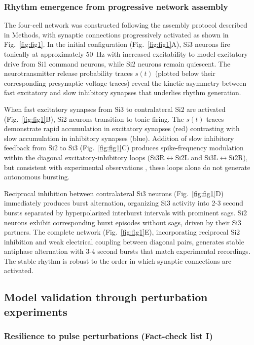 \documentclass[nofootinbib,aip,amsmath,amssymb,preprint,twocolumn,floatfix,10pt]{revtex4-2}
\begin{document}
\subsubsection{Rhythm emergence from progressive network assembly}
%
The four-cell network was constructed following the assembly protocol described in Methods, with synaptic connections progressively activated as shown in Fig.~\ref{fig:fig1}. In the initial configuration (Fig.~\ref{fig:fig1}A), Si3 neurons fire tonically at approximately 50~Hz with increased excitability to model excitatory drive from Si1 command neurons, while Si2 neurons remain quiescent. The neurotransmitter release probability traces $s(t)$ (plotted below their corresponding presynaptic voltage traces) reveal the kinetic asymmetry between fast excitatory and slow inhibitory synapses that underlies rhythm generation. 

When fast excitatory synapses from Si3 to contralateral Si2 are activated (Fig.~\ref{fig:fig1}B), Si2 neurons transition to tonic firing. The $s(t)$ traces demonstrate rapid accumulation in excitatory synapses (red) contrasting with slow accumulation in inhibitory synapses (blue). Addition of slow inhibitory feedback from Si2 to Si3 (Fig.~\ref{fig:fig1}C) produces spike-frequency modulation within the diagonal excitatory-inhibitory loops (Si3R$\leftrightarrow$Si2L and Si3L$\leftrightarrow$Si2R), but consistent with experimental observations \cite{SakuraiKatz2016}, these loops alone do not generate autonomous bursting. 

Reciprocal inhibition between contralateral Si3 neurons (Fig.~\ref{fig:fig1}D) immediately produces burst alternation, organizing Si3 activity into 2-3 second bursts separated by hyperpolarized interburst intervals with prominent sags. Si2 neurons exhibit corresponding burst episodes without sags, driven by their Si3 partners. The complete network (Fig.~\ref{fig:fig1}E), incorporating reciprocal Si2 inhibition and weak electrical coupling between diagonal pairs, generates stable antiphase alternation with 3-4 second bursts that match experimental recordings. The stable rhythm is robust to the order in which synaptic connections are activated.

\subsection{Model validation through perturbation experiments}

\subsubsection{Resilience to pulse perturbations (Fact-check list I)}
\end{document}
